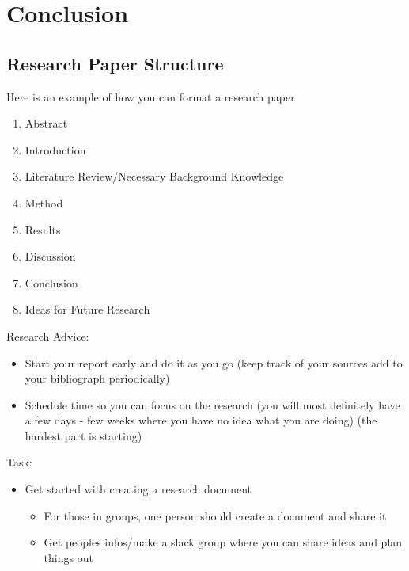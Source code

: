 \section{Conclusion}

\subsection{Research Paper Structure}
Here is an example of how you can format a research paper
\begin{enumerate}
    \item Abstract
    \item Introduction
    \item Literature Review/Necessary Background Knowledge
    \item Method
    \item Results
    \item Discussion
    \item Conclusion
    \item Ideas for Future Research
\end{enumerate}

\begin{frame}
Research Advice:
\begin{itemize}
    \item Start your report early and do it as you go (keep track of your sources add to your bibliograph periodically)
    \item Schedule time so you can focus on the research (you will most definitely have a few days - few weeks where you have no idea what you are doing) (the hardest part is starting)
\end{itemize}
\end{frame}
\begin{frame}
Task:
\begin{itemize}
    \item Get started with creating a research document
    \begin{itemize}
        \item For those in groups, one person should create a document and share it
        \item Get peoples infos/make a slack group where you can share ideas and plan things out
    \end{itemize}
\end{itemize}
\end{frame}